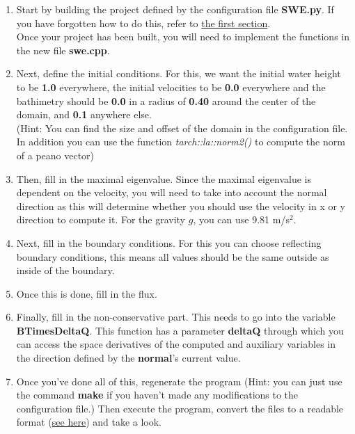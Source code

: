 \documentclass[12pt,letterpaper]{article}
\begin{document}
\begin{enumerate}
    \item
        Start by building the project defined by the configuration file \textbf{SWE.py}. If you have forgotten how to do this, refer to \hyperref[Verifying_and_building]{the first section}.\\
        
        Once your project has been built, you will need to implement the functions in the new file \textbf{swe.cpp}.
    \item
        Next, define the initial conditions. For this, we want the initial water height to be \textbf{1.0} everywhere, the initial velocities to be \textbf{0.0} everywhere and the bathimetry should be \textbf{0.0} in a radius of \textbf{0.40} around the center of the domain, and \textbf{0.1} anywhere else.\\
        (Hint: You can find the size and offset of the domain in the configuration file. In addition you can use the function \textit{tarch::la::norm2()} to compute the norm of a peano vector)
    \item
        Then, fill in the maximal eigenvalue. Since the maximal eigenvalue is dependent on the velocity, you will need to take into account the normal direction as this will determine whether you should use the velocity in x or y direction to compute it. For the gravity $g$, you can use 9.81 m/s$^2$.
    \item Next, fill in the boundary conditions. For this you can choose reflecting boundary conditions, this means all values should be the same outside as inside of the boundary.
    \item
        Once this is done, fill in the flux.
    \item
        Finally, fill in the non-conservative part. This needs to go into the variable \textbf{BTimesDeltaQ}. This function has a parameter \textbf{deltaQ} through which you can access the space derivatives of the computed and auxiliary variables in the direction defined by the \textbf{normal}'s current value.
    \item
        Once you've done all of this, regenerate the program (Hint: you can just use the command \textbf{make} if you haven't made any modifications to the configuration file.) Then execute the program, convert the files to a readable format (\hyperref[Visualize]{see here}) and take a look.\\
\end{enumerate}
\end{document}
